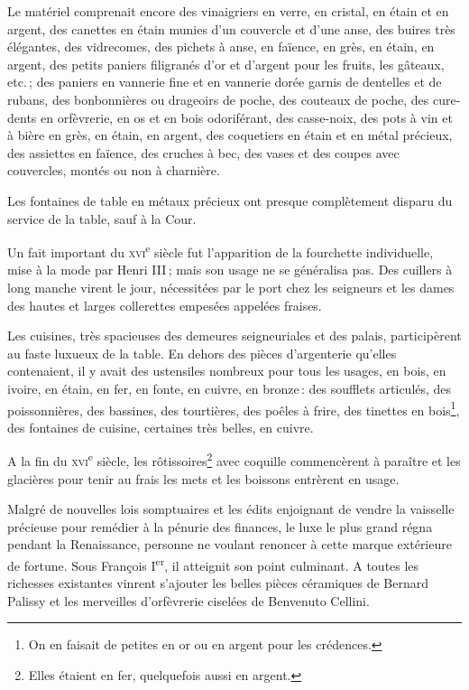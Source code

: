 Le matériel comprenait encore des vinaigriers en verre, en cristal, en étain et
en argent, des canettes en étain munies d'un couvercle et d'une anse, des
buires très élégantes, des vidrecomes, des pichets à anse, en faïence, en grès,
en étain, en argent, des petits paniers filigranés d'or et d'argent pour les
fruits, les gâteaux, etc. ; des paniers en vannerie fine et en vannerie dorée
garnis de dentelles et de rubans, des bonbonnières ou drageoirs de poche, des
couteaux de poche, des cure-dents en orfèvrerie, en os et en bois odoriférant,
des casse-noix, des pots à vin et à bière en grès, en étain, en argent, des
coquetiers en étain et en métal précieux, des assiettes en faïence, des cruches
à bec, des vases et des coupes avec couvercles, montés ou non à charnière.

Les fontaines de table en métaux précieux ont presque complètement disparu du
service de la table, sauf à la Cour.

Un fait important du \textsc{xvi}\textsuperscript{e} siècle fut l'apparition de
la fourchette individuelle, mise à la mode par Henri III ; mais son usage ne se
généralisa pas. Des cuillers à long manche virent le jour, nécessitées par le
port chez les seigneurs et les dames des hautes et larges collerettes empesées
appelées fraises.

Les cuisines, très spacieuses des demeures seigneuriales et des palais,
participèrent au faste luxueux de la table. En dehors des pièces d'argenterie
qu'elles contenaient, il y avait des ustensiles nombreux pour tous les usages,
en bois, en ivoire, en étain, en fer, en fonte, en cuivre, en bronze : des
soufflets articulés, des poissonnières, des bassines, des tourtières, des
poêles à frire, des tinettes en bois\footnote{On en faisait de petites en or
ou en argent pour les crédences.}, des fontaines de cuisine, certaines très
belles, en cuivre.

A la fin du \textsc{xvi}\textsuperscript{e} siècle, les
rôtissoires\footnote{Elles étaient en fer, quelquefois aussi en argent.} avec
coquille commencèrent à paraître et les glacières pour tenir au frais les mets
et les boissons entrèrent en usage.

Malgré de nouvelles lois somptuaires et les édits enjoignant de vendre la
vaisselle précieuse pour remédier à la pénurie des finances, le luxe le plus
grand régna pendant la Renaissance, personne ne voulant renoncer à cette marque
extérieure de fortune. Sous François I\textsuperscript{er}, il atteignit son
point culminant. A toutes les richesses existantes vinrent s'ajouter les belles
pièces céramiques de Bernard Palissy et les merveilles d'orfèvrerie ciselées de
Benvenuto Cellini.

